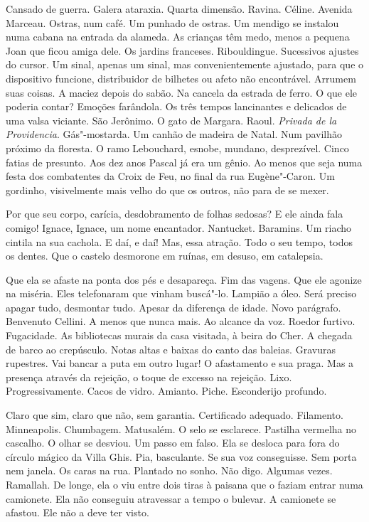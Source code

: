 Cansado de guerra. Galera ataraxia. Quarta dimensão. Ravina. Céline.
Avenida Marceau. Ostras, num café. Um punhado de ostras. Um mendigo se
instalou numa cabana na entrada da alameda. As crianças têm medo, menos
a pequena Joan que ficou amiga dele. Os jardins franceses. Ribouldingue.
Sucessivos ajustes do cursor. Um sinal, apenas um sinal, mas
convenientemente ajustado, para que o dispositivo funcione, distribuidor
de bilhetes ou afeto não encontrável. Arrumem suas coisas. A maciez
depois do sabão. Na cancela da estrada de ferro. O que ele poderia
contar? Emoções farândola. Os três tempos lancinantes e delicados de uma
valsa viciante. São Jerônimo. O gato de Margara. Raoul. \emph{Privada de
la Providencia}. Gás"-mostarda. Um canhão de madeira de Natal. Num
pavilhão próximo da floresta. O ramo Lebouchard, esnobe, mundano,
desprezível. Cinco fatias de presunto. Aos dez anos Pascal já era um
gênio. Ao menos que seja numa festa dos combatentes da Croix de Feu, no
final da rua Eugène"-Caron. Um gordinho, visivelmente mais velho do que
os outros, não para de se mexer.

Por que seu corpo, carícia, desdobramento de folhas sedosas? E ele ainda
fala comigo! Ignace, Ignace, um nome encantador. Nantucket. Baramins. Um
riacho cintila na sua cachola. E daí, e daí! Mas, essa atração. Todo o
seu tempo, todos os dentes. Que o castelo desmorone em ruínas, em
desuso, em catalepsia.

Que ela se afaste na ponta dos pés e desapareça. Fim das vagens. Que ele
agonize na miséria. Eles telefonaram que vinham buscá"-lo. Lampião a
óleo. Será preciso apagar tudo, desmontar tudo. Apesar da diferença de
idade. Novo parágrafo. Benvenuto Cellini. A menos que nunca mais. Ao
alcance da voz. Roedor furtivo. Fugacidade. As bibliotecas murais da
casa visitada, à beira do Cher. A chegada de barco ao crepúsculo. Notas
altas e baixas do canto das baleias. Gravuras rupestres. Vai bancar a
puta em outro lugar! O afastamento e sua praga. Mas a presença através
da rejeição, o toque de excesso na rejeição. Lixo. Progressivamente.
Cacos de vidro. Amianto. Piche. Esconderijo profundo.

Claro que sim, claro que não, sem garantia. Certificado adequado.
Filamento. Minneapolis. Chumbagem. Matusalém. O selo se esclarece.
Pastilha vermelha no cascalho. O olhar se desviou. Um passo em falso.
Ela se desloca para fora do círculo mágico da Villa Ghis. Pia,
basculante. Se sua voz conseguisse. Sem porta nem janela. Os caras na
rua. Plantado no sonho. Não digo. Algumas vezes. Ramallah. De longe, ela
o viu entre dois tiras à paisana que o faziam entrar numa camionete. Ela
não conseguiu atravessar a tempo o bulevar. A camionete se afastou. Ele
não a deve ter visto.

